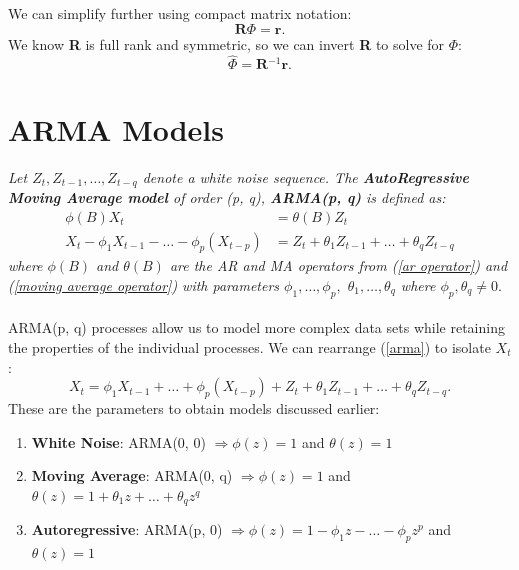 \documentclass{article}
\begin{document}
We can simplify further using compact matrix notation:
\begin{equation}\label{yule walker matrix}
    \textbf{R$\Phi$}=\textbf{r}.
\end{equation}
We know \textbf{R} is full rank and symmetric, so we can invert \textbf{R} to solve for \textbf{$\Phi$}:
\begin{equation}
    \hat{\textbf{$\Phi$}} = \textbf{R$^{-1}$r.}
\end{equation}

\section{ARMA Models}
\textit{Let $Z_t, Z_{t-1}, \ldots, Z_{t-q}$ denote a white noise sequence. The \textbf{AutoRegressive Moving Average model} of order (p, q), \textbf{ARMA(p, q)} is defined as:
\begin{align}\label{arma}
    \phi(B)X_t &= \theta(B)Z_t \nonumber\\
    X_t - \phi_1 X_{t-1} - \ldots - \phi_p(X_{t-p}) &= Z_t + \theta_1 Z_{t-1} + \ldots + \theta_q Z_{t-q}
\end{align}
where $\phi(B)$ and $\theta(B)$ are the AR and MA operators from (\ref{ar operator}) and (\ref{moving average operator}) with parameters $\phi_1, \ldots, \phi_p,$ $\theta_1, \ldots, \theta_q$ where $\phi_p, \theta_q \neq 0.$
}\\\\
ARMA(p, q) processes allow us to model more complex data sets while retaining the properties of the individual processes. We can rearrange (\ref{arma}) to isolate $X_t$:
\begin{equation}\label{arma isolate}
    X_t = \phi_1 X_{t-1} + \ldots + \phi_p(X_{t-p}) + Z_t + \theta_1 Z_{t-1} + \ldots + \theta_q Z_{t-q}.
\end{equation}
 These are the parameters to obtain models discussed earlier:
 \begin{enumerate}
     \item \textbf{White Noise}: ARMA(0, 0) $\Longrightarrow \phi(z)=1$ and $\theta(z)=1$
     \item \textbf{Moving Average}: ARMA(0, q) $\Longrightarrow \phi(z)=1$ and $\theta(z)=1+\theta_1 z + \ldots + \theta_q z^q$
     \item \textbf{Autoregressive}: ARMA(p, 0) $\Longrightarrow \phi(z)=1 - \phi_1z - \ldots - \phi_pz^p$ and $\theta(z)=1$
 \end{enumerate}
\end{document}
